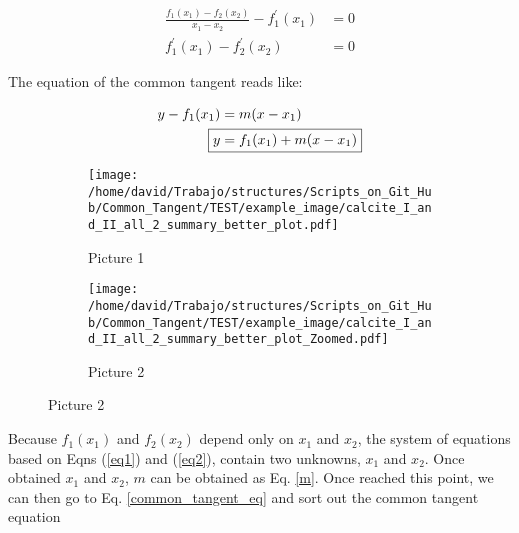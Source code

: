 \documentclass[12pt]{article}
\begin{document}
\begin{align}
\frac{f_{1} (x_1) - f_{2} (x_2)}{x_{1} - x_{2}} - f_{1}^{\prime} (x_1) &= 0 \label{eq1}\\
f_{1}^{\prime} (x_1) - f_{2}^{\prime} (x_2)  &= 0 \label{eq2}
\end{align}

The equation of the common tangent reads like:

\begin{align}
y - f_{1} (x_1)  &= m (x - x_1) \nonumber \\
\Aboxed{ y &= f_{1} (x_1) + m (x - x_1)} \label{common_tangent_eq}
\end{align}


\begin{figure}[h!]
\centering
  \begin{subfigure}[b]{0.4\textwidth}
    \texttt{[image: /home/david/Trabajo/structures/Scripts\_on\_Git\_Hub/Common\_Tangent/TEST/example\_image/calcite\_I\_and\_II\_all\_2\_summary\_better\_plot.pdf]}
    \caption{Picture 1}
    \label{fig:1}
  \end{subfigure}
\qquad
  \begin{subfigure}[b]{0.4\textwidth}
    \texttt{[image: /home/david/Trabajo/structures/Scripts\_on\_Git\_Hub/Common\_Tangent/TEST/example\_image/calcite\_I\_and\_II\_all\_2\_summary\_better\_plot\_Zoomed.pdf]}
    \caption{Picture 2}
    \label{fig:2}
  \end{subfigure}
\end{figure}


Because $f_{1}(x_1)$ and $f_{2} (x_2)$
depend only on $x_1$ and $x_2$,
the system of equations based on Eqns (\ref{eq1}) and (\ref{eq2}),
contain two unknowns, $x_1$
and $x_2$.
Once obtained $x_1$ and $x_2$,
$m$ can be obtained as Eq. \ref{m}.
Once reached this point,
we can then go to Eq. \ref{common_tangent_eq} and sort out the common tangent equation

%


\end{document}
